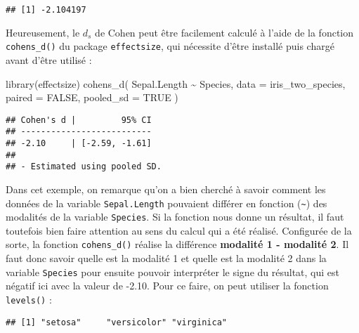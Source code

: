 \documentclass[
]{book}
\newenvironment{Shaded}{\begin{snugshade}}{\end{snugshade}}
\newcommand{\AttributeTok}[1]{\textcolor[rgb]{0.77,0.63,0.00}{#1}}
\newcommand{\ConstantTok}[1]{\textcolor[rgb]{0.00,0.00,0.00}{#1}}
\newcommand{\FunctionTok}[1]{\textcolor[rgb]{0.00,0.00,0.00}{#1}}
\newcommand{\NormalTok}[1]{#1}
\newcommand{\SpecialCharTok}[1]{\textcolor[rgb]{0.00,0.00,0.00}{#1}}
\begin{document}
\begin{verbatim}
## [1] -2.104197
\end{verbatim}

Heureusement, le \(d_{s}\) de Cohen peut être facilement calculé à l'aide de la fonction \texttt{cohens\_d()} du package \texttt{effectsize}, qui nécessite d'être installé puis chargé avant d'être utilisé :

\begin{Shaded}
\begin{Highlighting}[]
\FunctionTok{library}\NormalTok{(effectsize)}
\FunctionTok{cohens\_d}\NormalTok{(}
\NormalTok{  Sepal.Length }\SpecialCharTok{\textasciitilde{}}\NormalTok{ Species, }
  \AttributeTok{data =}\NormalTok{ iris\_two\_species, }
  \AttributeTok{paired =} \ConstantTok{FALSE}\NormalTok{, }
  \AttributeTok{pooled\_sd =} \ConstantTok{TRUE}
\NormalTok{  )}
\end{Highlighting}
\end{Shaded}

\begin{verbatim}
## Cohen's d |         95% CI
## --------------------------
## -2.10     | [-2.59, -1.61]
## 
## - Estimated using pooled SD.
\end{verbatim}

Dans cet exemple, on remarque qu'on a bien cherché à savoir comment les données de la variable \texttt{Sepal.Length} pouvaient différer en fonction (\texttt{\textasciitilde{}}) des modalités de la variable \texttt{Species}. Si la fonction nous donne un résultat, il faut toutefois bien faire attention au sens du calcul qui a été réalisé. Configurée de la sorte, la fonction \texttt{cohens\_d()} réalise la différence \textbf{modalité 1 - modalité 2}. Il faut donc savoir quelle est la modalité 1 et quelle est la modalité 2 dans la variable \texttt{Species} pour ensuite pouvoir interpréter le signe du résultat, qui est négatif ici avec la valeur de -2.10. Pour ce faire, on peut utiliser la fonction \texttt{levels()} :

\begin{Shaded}
\end{Shaded}

\begin{verbatim}
## [1] "setosa"     "versicolor" "virginica"
\end{verbatim}
\end{document}
